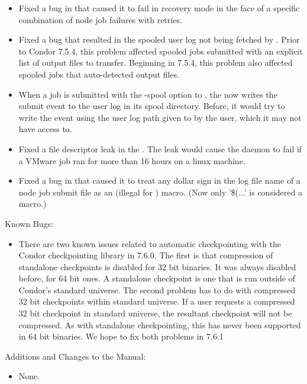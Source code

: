 \begin{itemize}

\item Fixed a bug in  that caused it to fail in recovery
mode in the face of a specific combination of node job failures with
retries.

\item Fixed a bug that resulted in the spooled user log not being
  fetched by .  Prior to Condor 7.5.4, this
  problem affected spooled jobs submitted with an explicit list of
  output files to transfer.  Beginning in 7.5.4, this problem also
  affected spooled jobs that auto-detected output files.

\item When a job is submitted with the -spool option to ,
the  now writes the submit event to the user log in its
spool directory. Before, it would try to write the event using the user
log path given to  by the user, which it may not have
access to.

\item Fixed a file descriptor leak in the . The leak would
cause the daemon to fail if a VMware job ran for more than 16 hours on a
linux machine.

\item Fixed a bug in  that caused it to treat any dollar
sign in the log file name of a node job submit file as an (illegal for
) macro.  (Now only '\$(...' is considered a macro.)

\end{itemize}

\noindent Known Bugs:

\begin{itemize}

\item There are two known issues related to automatic checkpointing with the
Condor checkpointing library in 7.6.0.  The first is that compression of
standalone checkpoints is disabled for 32 bit binaries.  It was always disabled
before, for 64 bit ones.  A standalone checkpoint is one that is run outside
of Condor's standard universe.  The second problem has to do with compressed
32 bit checkpoints within standard universe.  If a user requests a compressed
32 bit checkpoint in standard universe, the resultant checkpoint will not
be compressed.  As with standalone checkpointing, this has never been supported
in 64 bit binaries.  We hope to fix both problems in 7.6.1

\end{itemize}

\noindent Additions and Changes to the Manual:

\begin{itemize}

\item None.

\end{itemize}

